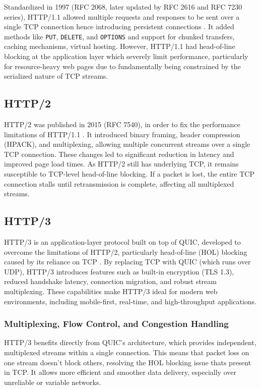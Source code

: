 Standardized in 1997 (RFC 2068, later updated by RFC 2616 and RFC 7230 series), HTTP/1.1 allowed multiple requests and responses to be sent over a single TCP connection hence introducing persistent connections \cite{kurose2017}. It added  methods like \texttt{PUT}, \texttt{DELETE}, and \texttt{OPTIONS} and support for chunked transfers, caching mechanisms, virtual hosting. However, HTTP/1.1 had head-of-line blocking at the application layer which severely limit performance, particularly for resource-heavy web pages due to fundamentally being constrained by the serialized nature of TCP streams.

\subsection{HTTP/2}

HTTP/2 was published in 2015 (RFC 7540), in order to fix the performance limitations of HTTP/1.1 \cite{kurose2017}. It introduced binary framing, header compression (HPACK), and multiplexing, allowing multiple concurrent streams over a single TCP connection. These changes led to significant reduction in latency and improved page load times. As HTTP/2 still has underlying TCP, it remains susceptible to TCP-level head-of-line blocking. If a packet is lost, the entire TCP connection stalls until retransmission is complete, affecting all multiplexed streams.

\subsection{HTTP/3}

HTTP/3 is an application-layer protocol built on top of QUIC, developed to overcome the limitations of HTTP/2, particularly head-of-line (HOL) blocking caused by its reliance on TCP \cite{rfc9114} \cite{marx2021-http3}. By replacing TCP with QUIC (which runs over UDP), HTTP/3 introduces features such as built-in encryption (TLS 1.3), reduced handshake latency, connection migration, and robust stream multiplexing. These capabilities make HTTP/3 ideal for modern web environments, including mobile-first, real-time, and high-throughput applications.

\subsubsection{Multiplexing, Flow Control, and Congestion Handling}

HTTP/3 benefits directly from QUIC’s architecture, which provides independent, multiplexed streams within a single connection. This means that packet loss on one stream doesn’t block others, resolving the HOL blocking issue thats present in TCP. It allows more efficient and smoother data delivery, especially over unreliable or variable networks.

